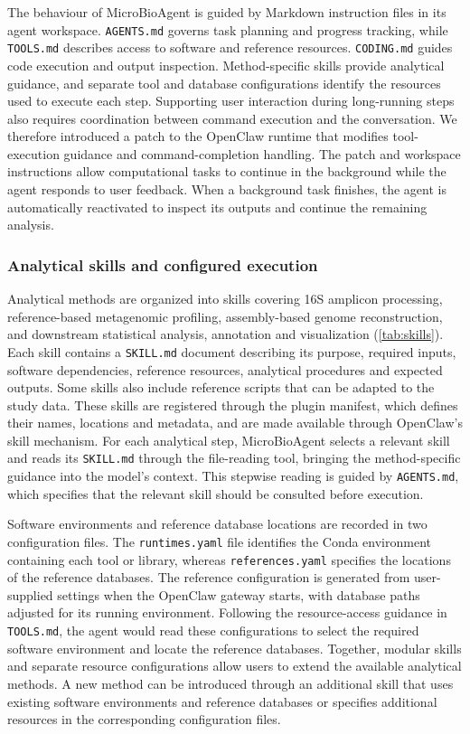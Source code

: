 \documentclass[10pt,letterpaper]{article}
\begin{document}
The behaviour of MicroBioAgent is guided by Markdown instruction files in
its agent workspace.  \texttt{AGENTS.md} governs task planning and progress
tracking, while \texttt{TOOLS.md} describes access to software and reference
resources.  \texttt{CODING.md} guides code execution and output inspection.
Method-specific skills provide analytical guidance, and separate tool and
database configurations identify the resources used to execute each step.
Supporting user interaction during long-running steps also requires
coordination between command execution and the conversation.  We therefore
introduced a patch to the OpenClaw runtime that modifies tool-execution
guidance and command-completion handling.  The patch and workspace
instructions allow computational tasks to continue in the background while
the agent responds to user feedback.  When a background task finishes, the
agent is automatically reactivated to inspect its outputs and continue the
remaining analysis.

\subsubsection{Analytical skills and configured execution}
\label{sec:skills-execution}

Analytical methods are organized into skills covering 16S amplicon processing, 
reference-based metagenomic profiling, assembly-based genome reconstruction, 
and downstream statistical analysis, annotation and visualization (\cref{tab:skills}).
Each skill contains a \texttt{SKILL.md} document describing its purpose, required 
inputs, software dependencies, reference resources, analytical procedures and 
expected outputs. Some skills also include reference scripts that can be adapted 
to the study data. These skills are registered through the plugin manifest, 
which defines their names, locations and metadata, and are made available through 
OpenClaw's skill mechanism. For each analytical step, MicroBioAgent selects a 
relevant skill and reads its \texttt{SKILL.md} through the file-reading tool, 
bringing the method-specific guidance into the model's context. This stepwise 
reading is guided by \texttt{AGENTS.md}, which specifies that the relevant skill 
should be consulted before execution.

Software environments and reference database locations are recorded in two 
configuration files. The \texttt{runtimes.yaml} file identifies the Conda environment 
containing each tool or library, whereas \texttt{references.yaml} specifies the 
locations of the reference databases. The reference configuration is generated from 
user-supplied settings when the OpenClaw gateway starts, with database paths adjusted 
for its running environment. Following the resource-access guidance in \texttt{TOOLS.md}, 
the agent would read these configurations to select the required software environment and 
locate the reference databases. Together, modular skills and separate resource configurations 
allow users to extend the available analytical methods. A new method can be introduced 
through an additional skill that uses existing software environments and reference databases 
or specifies additional resources in the corresponding configuration files.
\end{document}
